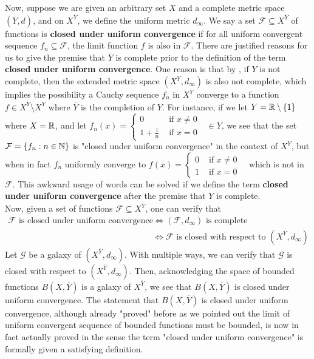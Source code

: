 \documentclass{report}
\begin{document}
\begin{mdframed}
Now, suppose we are given an arbitrary set  $X$ and a complete metric space  $(\overline{Y},d)$, and on $X^{\overline{Y}}$, we define the uniform metric  $d_{\infty}$. We say a set $\mathcal{F}\subseteq X^{\overline{Y}}$ of functions is \textbf{closed under uniform convergence} if  for all uniform convergent sequence $f_n \subseteq \mathcal{F}$, the limit function $f$ is also in  $\mathcal{F}$. There are justified reasons for us to give the premise that $\overline{Y}$ is complete prior to the definition of the term \textbf{closed under uniform convergence}. One reason is that by , if $Y$ is not complete, then the extended metric space  $(X^Y,d_{\infty})$ is also not complete, which implies the possibility a Cauchy sequence $f_n$ in  $X^Y$ converge to a function $f \in X^{\overline{Y}} \setminus X^Y$ where $\overline{Y}$ is the completion of  $Y$. For instance, if we let $Y=\mathbb{R}\setminus \{ 1 \}$ where $X=\mathbb{R}$, and let $f_n(x)=\begin{cases}
  0& \text{ if  }x\neq 0\\
  1+\frac{1}{n}& \text{ if $x=0$ }
\end{cases}\in Y$, we see that the set $\mathcal{F}=\{ f_n:n\in\mathbb{N} \}$ is "closed under uniform convergence" in the context of $X^Y$, but when in fact $f_n$ uniformly converge to  $f(x)=\begin{cases}
  0& \text{ if  }x\neq 0\\
  1& \text{ if $x=0$ }
\end{cases}$ which is not in $\mathcal{F}$. This awkward usage of words can be solved if we define the term  \textbf{closed under uniform convergence} after the premise that $Y$ is complete.\\

Now, given a set of functions $\mathcal{F}\subseteq X^{\overline{Y}}$, one can verify that 
\begin{align*}
  \mathcal{F}\text{ is closed under uniform convergence }&\iff (\mathcal{F},d_{\infty})\text{ is complete }\\
&\iff \mathcal{F}\text{ is closed with respect to $(X^{\overline{Y}},d_{\infty})$ }
\end{align*}
Let $\mathcal{G}$ be a galaxy of $(X^{\overline{Y}},d_{\infty})$. With multiple ways, we can verify that $\mathcal{G}$ is closed with respect to $(X^{\overline{Y}},d_{\infty})$. Then, acknowledging the space of bounded functions $B(X,\overline{Y})$ is a galaxy of $X^{\overline{Y}}$, we see that $B(X,\overline{Y})$ is closed under uniform convergence. The statement that $B(X,\overline{Y})$ is closed under uniform convergence, although already "proved" before as we pointed out the limit of uniform convergent sequence of bounded functions must be bounded, is now in fact actually proved in the sense the term "closed under uniform convergence" is formally given a satisfying definition.
\end{mdframed}
\end{document}
